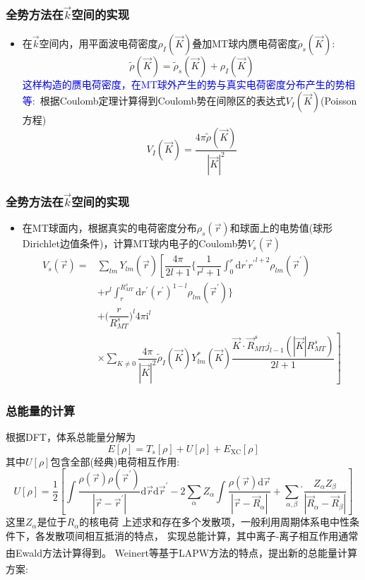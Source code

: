 \documentclass[cjk,slidestop,compress,mathserif,blue]{beamer}
\newcommand{\upcite}[1]{\hspace{0ex}\textsuperscript{\cite{#1}}} %
\begin{document}
\frame
{
	\frametitle{全势方法在$\vec k$空间的实现}
\begin{itemize}
	\item 在$\vec k$空间内，用平面波电荷密度$\rho_I(\vec K)$叠加\textrm{MT}球内赝电荷密度$\tilde\rho_s(\vec K)$:
		\begin{displaymath}
			\tilde\rho(\vec K)=\tilde\rho_s(\vec K)+\rho_I(\vec K)
		\end{displaymath}
		\textcolor{blue}{这样构造的赝电荷密度，在\textrm{MT}球外产生的势与真实电荷密度分布产生的势相等}:~根据\textrm{Coulomb}定理计算得到\textrm{Coulomb}势在间隙区的表达式$V_I(\vec K)$(\textrm{Poisson}方程)
		\begin{displaymath}
			V_I(\vec K)=\dfrac{4\pi\tilde\rho(\vec K)}{|\vec K|^2}
		\end{displaymath}
\end{itemize}
}

\frame
{
	\frametitle{全势方法在$\vec k$空间的实现}
\begin{itemize}
	\item 在\textrm{MT}球面内，根据真实的电荷密度分布$\rho_s(\vec r)$和球面上的电势值(球形\textrm{Dirichlet}边值条件)，计算\textrm{MT}球内电子的\textrm{Coulomb}势$V_s(\vec r)$
		\begin{displaymath}
			\begin{aligned}
				V_s(\vec r)=&\sum_{lm}Y_{lm}(\hat{\vec r})\left[\dfrac{4\pi}{2l+1}\bigg\{\dfrac1{r^l+1}\int_0^r\mathrm{d}r^{\prime}{r^{\prime}}^{l+2}\rho_{lm}(\vec r^{\prime})\right.\\
					&+r^l\int_r^{R_{MT}^s}\mathrm{d}r^{\prime}(r^{\prime})^{1-l}\rho_{lm}(\vec r^{\prime})\bigg\}\\
					&+\bigg(\dfrac r{R_{MT}^s}\bigg)^l4\pi\mathrm{i}^l\\
					&\times\sum_{K\neq0}\left.\dfrac{4\pi}{|\vec K|^2}\tilde\rho_I(\vec K)Y_{lm}^{\ast}(\vec K)\dfrac{\vec K\cdot\vec R_{MT}^sj_{l-1}(|\vec K|R_{MT}^s)}{2l+1}\right]
			\end{aligned}
		\end{displaymath}
\end{itemize}
}

\frame
{
	\frametitle{总能量的计算}
	根据\textrm{DFT}，体系总能量分解为
	\begin{displaymath}
		E[\rho]=T_s[\rho]+U[\rho]+E_{\mathrm{XC}}[\rho]
	\end{displaymath}
	其中$U[\rho]$包含全部(经典)电荷相互作用:~
	\begin{displaymath}
		U[\rho]=\dfrac12\left[\int\dfrac{\rho(\vec r)\rho(\vec r^{\prime})}{|\vec r-\vec r^{\prime}|}\mathrm{d}\vec r\mathrm{d}\vec r^{\prime}-2\sum_{\alpha}Z_{\alpha}\int\dfrac{\rho(\vec r)\mathrm{d}\vec r}{|\vec r-\vec R_{\alpha}|}+\sum_{\alpha,\beta}{}^{\prime}\dfrac{Z_{\alpha}Z_{\beta}}{|\vec R_{\alpha}-\vec R_{\beta}|}\right]
	\end{displaymath}
	这里$Z_{\alpha}$是位于$R_{\alpha}$的核电荷
\vskip 5pt
	上述求和存在多个发散项，一般利用周期体系电中性条件下，各发散项间相互抵消的特点， 实现总能计算，其中离子-离子相互作用通常由\textrm{Ewald}方法\upcite{JPC-SSP12-4409_1979}计算得到。
\vskip 5pt
	\textrm{Weinert}等基于\textrm{LAPW}方法的特点，提出新的总能量计算方案\upcite{PRB26-4571_1982}:
}
\end{document}

